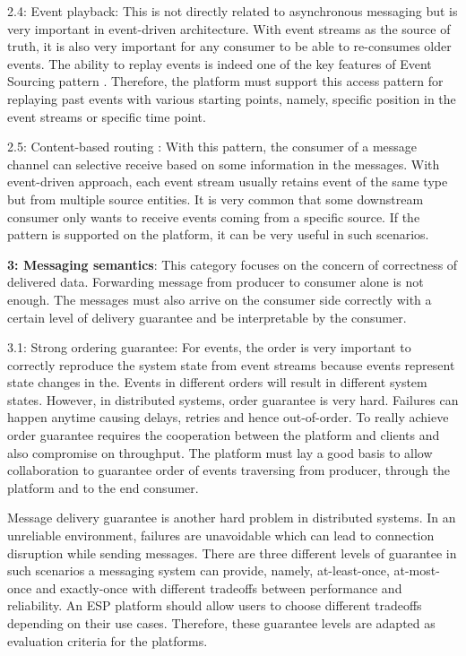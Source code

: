2.4: Event playback: This is not directly related to asynchronous messaging but is very important in event-driven architecture. With event streams as the source of truth, it is also very important for any consumer to be able to re-consumes older events. The ability to replay events is indeed one of the key features of Event Sourcing pattern \cite{eventsourcingfowler}. Therefore, the platform must support this access pattern for replaying past events with various starting points, namely, specific position in the event streams or specific time point.

2.5: Content-based routing \cite{messagingcontainedbasedrouter}: 
With this pattern, the consumer of a message channel can selective receive based on some information in the messages. With event-driven approach, each event stream usually retains event of the same type but from multiple source entities. It is very common that some downstream consumer only wants to receive events coming from a specific source. If the pattern is supported on the platform, it can be very useful in such scenarios. 

\textbf{3: Messaging semantics}: This category focuses on the concern of correctness of delivered data. Forwarding message from producer to consumer alone is not enough. The messages must also arrive on the consumer side correctly with a certain level of delivery guarantee and be interpretable by the consumer. 

3.1: Strong ordering guarantee: For events, the order is very important to correctly reproduce the system state from event streams because events represent state changes in the. Events in different orders will result in different system states. However, in distributed systems, order guarantee is very hard. Failures can happen anytime causing delays, retries and hence out-of-order. To really achieve order guarantee requires the cooperation between the platform and clients and also compromise on throughput. The platform must lay a good basis to allow collaboration to guarantee order of events traversing from producer, through the platform and to the end consumer.

Message delivery guarantee is another hard problem in distributed systems. In an unreliable environment, failures are unavoidable which can lead to connection disruption while sending messages. There are three different levels of guarantee in such scenarios a messaging system can provide, namely, at-least-once, at-most-once and exactly-once with different tradeoffs between performance and reliability. An ESP platform should allow users to choose different tradeoffs depending on their use cases. Therefore, these guarantee levels are adapted as evaluation criteria for the platforms.


